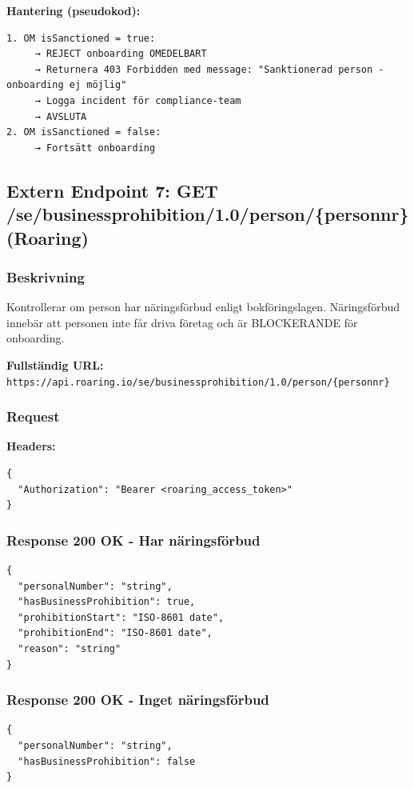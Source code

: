 \textbf{Hantering (pseudokod):}
\begin{lstlisting}
1. OM isSanctioned = true:
     → REJECT onboarding OMEDELBART
     → Returnera 403 Forbidden med message: "Sanktionerad person - onboarding ej möjlig"
     → Logga incident för compliance-team
     → AVSLUTA
2. OM isSanctioned = false:
     → Fortsätt onboarding
\end{lstlisting}

\subsection{Extern Endpoint 7: GET /se/businessprohibition/1.0/person/\{personnr\} (Roaring)}

\subsubsection{Beskrivning}

Kontrollerar om person har näringsförbud enligt bokföringslagen. Näringsförbud innebär att personen inte får driva företag och är BLOCKERANDE för onboarding.

\textbf{Fullständig URL:} \texttt{https://api.roaring.io/se/businessprohibition/1.0/person/\{personnr\}}

\subsubsection{Request}

\textbf{Headers:}
\begin{lstlisting}
{
  "Authorization": "Bearer <roaring_access_token>"
}
\end{lstlisting}

\subsubsection{Response 200 OK - Har näringsförbud}

\begin{lstlisting}
{
  "personalNumber": "string",
  "hasBusinessProhibition": true,
  "prohibitionStart": "ISO-8601 date",
  "prohibitionEnd": "ISO-8601 date",
  "reason": "string"
}
\end{lstlisting}

\subsubsection{Response 200 OK - Inget näringsförbud}
\begin{lstlisting}
{
  "personalNumber": "string",
  "hasBusinessProhibition": false
}
\end{lstlisting}

